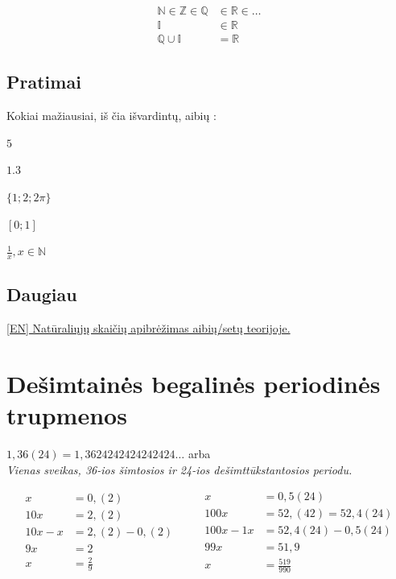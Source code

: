 \documentclass[fleqn]{article} %
\newenvironment{exercises}{\begin{enumerate*}[label=\alph*), itemjoin=\qquad]}{\end{enumerate*}}
\begin{document}
\begin{align}
    \mathbb{N} \in \mathbb{Z} \in \mathbb{Q} & \in \mathbb{R} \in \dots \\
    \mathbb{I} & \in \mathbb{R} \\
    \mathbb{Q} \cup \mathbb{I} & = \mathbb{R}
\end{align}

\subsection{Pratimai}

Kokiai mažiausiai, iš čia išvardintų, aibių : \\
\begin{exercises}
    \item $5$
    \item $1.3$
    \item $\{1; 2; 2\pi\}$
    \item $\left[0; 1\right]$ 
    \item $\frac{1}{x}, x \in \mathbb{N}$ 
\end{exercises} 

\subsection{Daugiau}

\href {https://en.wikipedia.org/wiki/Set-theoretic_definition_of_natural_numbers}{[EN] Natūraliųjų skaičių apibrėžimas aibių/setų teorijoje.}

\section{Dešimtainės begalinės periodinės trupmenos} 
$1,36(24) = 1,3624242424242424 \dots$ arba \\
\textit{Vienas sveikas, 36-ios šimtosios ir 24-ios dešimttūkstantosios periodu.}

\begin{equation}
    \begin{aligned}
        x       &= 0,(2)        \\
        10x     &= 2,(2)        \\
        10x - x &= 2,(2) - 0,(2)\\
        9x      &= 2            \\ 
        x       &= \frac{2}{9}
      \end{aligned}
      \qquad
      \begin{aligned}
        x         &= 0,5(24)            \\
        100x      &= 52,(42) = 52,4(24) \\
        100x - 1x &= 52,4(24) - 0,5(24) \\ 
        99x       &= 51,9               \\
        x         &= \frac{519}{990} 
      \end{aligned}
  \end{equation}
\end{document}
